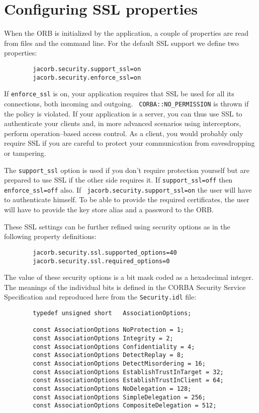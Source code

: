 \documentclass[12pt]{scrbook}
\begin{document}
\section{Configuring SSL properties}

When the ORB is initialized by the application, a couple of properties
are read from files and the  command line. For the default SSL support
we define two properties:

\begin{verbatim}
        jacorb.security.support_ssl=on
        jacorb.security.enforce_ssl=on    
\end{verbatim}

If {\tt  enforce\_ssl} is  on, your application  requires that  SSL be
used  for  all  its  connections,  both incoming  and  outgoing.  {\tt
CORBA::NO\_PERMISSION} is  thrown if the  policy is violated.  If your
application is  a server,  you can thus  use SSL to  authenticate your
clients and,  in more  advanced scenarios using  interceptors, perform
operation--based access control. As  a client, you would probably only
require  SSL if  you are  careful to  protect your  communication from
eavesdropping or tampering.

The {\tt support\_ssl} option is  used if you don't require protection
yourself but  are prepared to use  SSL if the other  side requires it.
If {\tt  support\_ssl=off} then {\tt enforce\_ssl=off}  also.  If {\tt
jacorb.security.support\_ssl=on}  the user  will have  to authenticate
himself. To  be able  to provide the  required certificates,  the user
will have to provide the key store alias and a password to the ORB.

These SSL settings can be further refined using security options as in
the following property definitions:

\begin{verbatim}
        jacorb.security.ssl.supported_options=40
        jacorb.security.ssl.required_options=0
\end{verbatim}

The  value  of  these security  options  is  a  bit  mask coded  as  a
hexadecimal integer. The meanings of the individual bits is defined in
the CORBA Security Service  Specification and reproduced here from the
{\tt Security.idl} file:

\begin{verbatim}
        typedef unsigned short   AssociationOptions;

        const AssociationOptions NoProtection = 1;
        const AssociationOptions Integrity = 2; 
        const AssociationOptions Confidentiality = 4; 
        const AssociationOptions DetectReplay = 8; 
        const AssociationOptions DetectMisordering = 16;
        const AssociationOptions EstablishTrustInTarget = 32; 
        const AssociationOptions EstablishTrustInClient = 64;
        const AssociationOptions NoDelegation = 128;
        const AssociationOptions SimpleDelegation = 256; 
        const AssociationOptions CompositeDelegation = 512;
\end{verbatim}
\end{document}
